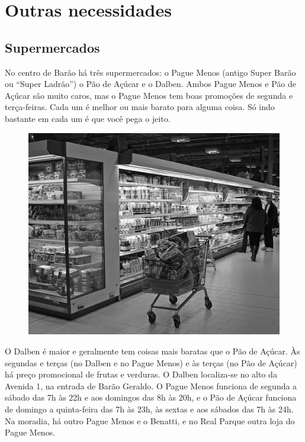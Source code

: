 
\section{Outras necessidades}
\subsection{Supermercados}

No centro de Barão há três supermercados: o Pague Menos (antigo Super Barão ou
``Super Ladrão'') o Pão de Açúcar e o Dalben. Ambos Pague Menos e Pão de Açúcar
são muito caros, mas o Pague Menos tem boas promoções de segunda e terça-feiras.
Cada um é melhor ou mais barato para alguma coisa. Só indo bastante em cada um é
que você pega o jeito.

\begin{figure}[h!]
    \centering
    \includegraphics[scale=0.42,keepaspectratio=true]{img/imgs/9-outras_necessidades/supermercado.jpg}
\end{figure}

O Dalben é maior e geralmente tem coisas mais baratas que o Pão de Açúcar. Às
segundas e terças (no Dalben e no Pague Menos) e às terças (no Pão de Açúcar) há
preço promocional de frutas e verduras. O Dalben localiza-se no alto da Avenida
1, na entrada de Barão Geraldo. O Pague Menos funciona de segunda a sábado das
7h às 22h e aos domingos das 8h às 20h, e o Pão de Açúcar funciona de domingo a
quinta-feira das 7h às 23h, às sextas e aos sábados das 7h às 24h. Na moradia,
há outro Pague Menos e o Benatti, e no Real Parque outra loja do Pague Menos.

